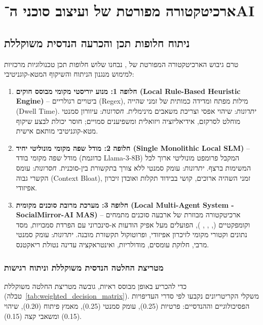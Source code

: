 \chapter{ארכיטקטורה מפורטת של \projectname{} ועיצוב סוכני ה־\textenglish{AI}}
\label{chap:detailed_architecture}

\section{ניתוח חלופות תכן והכרעה הנדסית משוקללת}
\label{sec:arch_design_alternatives}
טרם גיבוש הארכיטקטורה המפורטת של \projectname{}, נבחנו שלוש חלופות תכן טכנולוגיות מרכזיות למימוש מנגנון הניתוח והשיקוף המטא-קוגניטיבי:
\begin{enumerate}
    \item \textbf{חלופה 1: מנוע יוריסטי מקומי מבוסס חוקים (\textenglish{Local Rule-Based Heuristic Engine})} -- ביטויים רגולריים (\textenglish{Regex}), מילות מפתח ומדידה כמותית של זמני שהייה (\textenglish{Dwell Time}). \textit{יתרונות}: שיהוי אפסי וצריכת משאבים מינימלית. \textit{חסרונות}: עיוורון סמנטי מוחלט לסרקזם, אידיאליזציה ויזואלית ומשפיענים סמויים; חוסר יכולת לבצע שיקוף מטא-קוגניטיבי מותאם אישית.
    \item \textbf{חלופה 2: מודל שפה מקומי מונוליטי יחיד (\textenglish{Single Monolithic Local SLM})} -- מודל שפה מקומי בודד (כדוגמת \textenglish{Llama-3-8B}) המקבל פרומפט מונוליטי ארוך לכל המשימות ברצף. \textit{יתרונות}: עומק סמנטי ללא צורך בתקשורת בין-סוכנית. \textit{חסרונות}: עומס הקשרי גבוה (\textenglish{Context Bloat}), זמני השהיה ארוכים, קושי בבידוד תקלות ואובדן זיכרון אפיזודי.
    \item \textbf{חלופה 3: מערכת מרובת סוכנים מקומית (\textenglish{Local Multi-Agent System - SocialMirror-AI MAS})} -- ארכיטקטורה מבוזרת של ארבעה סוכנים מתמחים וקומפקטיים (\agentObserver{}, \agentAnalyst{}, \agentReflector{}, \agentInterventionist{}), הפועלים מעל אפיק הודעות א-סינכרוני עם הפרדת סמכויות, מסד נתונים וקטורי מקומי לזיכרון אפיזודי, ופרוטוקול תקשורת מובנה. \textit{יתרונות}: עומק סמנטי מרבי, חלוקת עומסים, מודולריות, ואינטראקציה עדינה נטולת ריאקטנס.
\end{enumerate}

\subsection{מטריצת החלטה הנדסית משוקללת וניתוח רגישות}
כדי להכריע באופן מבוסס ראיות, גובשה מטריצת החלטה משוקללת (טבלה~\ref{tab:weighted_decision_matrix}). משקלי הקריטריונים נקבעו לפי סדרי העדיפויות הפסיכולוגיים וההנדסיים: פרטיות (0.25), עומק סמנטי (0.25), מאמץ פיתוח (0.20), שיהוי (0.15) ומשאבי קצה (0.15).

